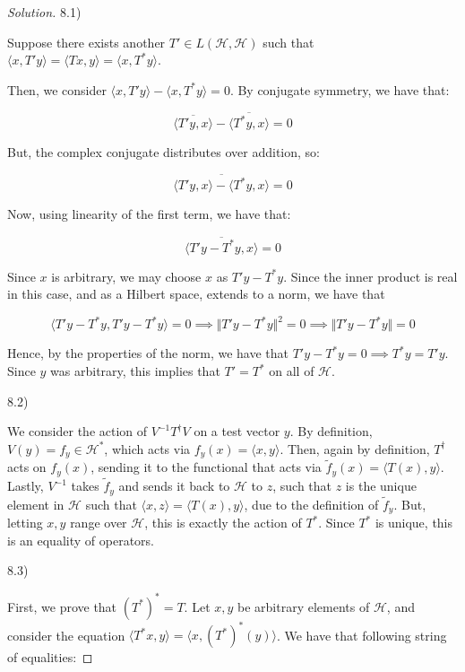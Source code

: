 \documentclass[10pt]{article}
\begin{document}
\begin{proof}[Solution]

8.1)

Suppose there exists another $T' \in L(\mathcal{H}, \mathcal{H})$ such that $\langle x, T' y \rangle  = \langle Tx, y \rangle = \langle x, T^* y \rangle$.

Then, we consider $\langle x, T'y \rangle - \langle x, T^* y \rangle = 0$. By conjugate symmetry, we have that:

$$ \overline{\langle T'y, x \rangle} - \overline{\langle T^*y, x \rangle} = 0$$

But, the complex conjugate distributes over addition, so:

$$ \overline{\langle T'y, x \rangle - \langle T^*y, x \rangle } = 0$$

Now, using linearity of the first term, we have that:

$$ \overline{\langle T'y - T^*y , x \rangle } = 0 $$

Since $x$ is arbitrary, we may choose $x$ as $T'y - T^* y$. Since the inner product is real in this case, and as a Hilbert space, extends to a norm, we have that

$$\langle T'y - T^*y , T'y - T^*y \rangle = 0 \implies  \Vert T'y - T^*y \Vert^2 = 0 \implies \Vert T'y - T^*y \Vert = 0$$

Hence, by the properties of the norm, we have that $T' y - T^*y = 0 \implies T^*y = T'y$. Since $y$ was arbitrary, this implies that $T' = T^*$ on all of $\mathcal{H}$.

8.2)

We consider the action of $V^{-1} T^\dag V$ on a test vector $y$. By definition, $V(y) = f_y \in \mathcal{H}^*$, which acts via $f_y(x) = \langle x, y \rangle$. Then, again by definition, $T^\dag$ acts on $f_y(x)$, sending it to the functional that acts via $\tilde{f}_y(x) = \langle T(x), y \rangle$. Lastly, $V^{-1}$ takes $\tilde{f}_y$ and sends it back to $\mathcal{H}$ to $z$, such that $z$ is the unique element in $\mathcal{H}$ such that $\langle x, z \rangle = \langle T(x), y \rangle$, due to the definition of $\tilde{f}_y$. But, letting $x, y$ range over $\mathcal{H}$, this is exactly the action of $T^*$. Since $T^*$ is unique, this is an equality of operators.

8.3)

First, we prove that $(T^*)^* = T$. Let $x, y$ be arbitrary elements of $\mathcal{H}$, and consider the equation $\langle T^* x, y \rangle = \langle x, (T^*)^*(y) \rangle$. We have that following string of equalities:


\end{proof}
\end{document}
